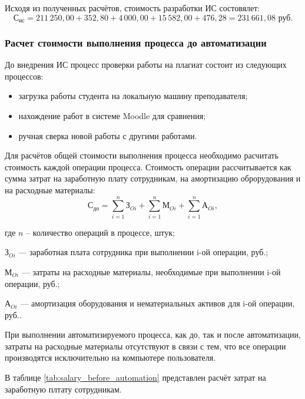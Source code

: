 			Исходя из полученных расчётов, стоимость разработки ИС состовялет:
			$$\text{С}_{\text{ис}} = 211\,250,00 + 352,80 + 4\,000,00 +  15\,582,00 + 476,28 = 231\,661,08 \text{ руб.}$$			
		
		\subsubsection{Расчет стоимости выполнения процесса до автоматизации}

			До внедрения ИС процесс проверки работы на плагиат состоит из следующих процессов:
			\begin{itemize}
				\item загрузка работы студента на локальную машину преподавателя;
				\item нахождение работ в системе Moodle для сравнения;
				\item ручная сверка новой работы с другими работами.
			\end{itemize}

			Для расчётов общей стоимости выполнения процесса необходимо расчитать стоимость каждой операции процесса. Стоимость операции рассчитывается как сумма затрат на заработную плату сотрудникам, на амортизацию оброрудования и на расходные материалы:
			\begin{equation}\label{eq:cost_before_automation}
				\text{С}_{\text{до}} = \sum_{i=1}^{n} \text{З}_{Oi} + \sum_{i=1}^{n} \text{М}_{Oi} + \sum_{i=1}^{n} \text{А}_{Oi} ,
			\end{equation}
			\begin{ESKDexplanation}
				\item[где ]$n$ – количество  операций в процессе, штук;
				\item $\text{З}_{Oi}$ --- заработная плата сотрудника при выполнении i-ой операции, руб.;
				\item $\text{М}_{Oi}$ --- затраты на расходные материалы, необходимые при выполнении i-ой операции, руб.;
				\item $\text{А}_{Oi}$ --- амортизация оборудования и нематериальных активов для i-ой  операции, руб..
			\end{ESKDexplanation}	
			
			При выполнении автоматизируемого процесса, как до, так и после автоматизации, затраты на расходные материалы отсутствуют в связи с тем, что все операции производятся исключительно на компьютере пользователя.


			В таблице \ref{tab:salary_before_automation} представлен расчёт затрат на заработную плтату сотрудникам.

